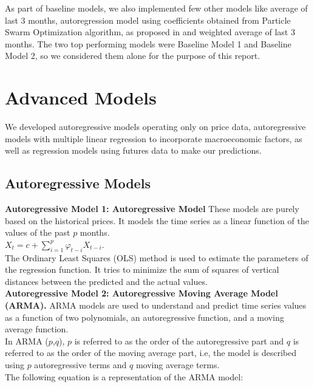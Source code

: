 \documentclass[runningheads]{llncs}
\begin{document}
As part of baseline models, we also implemented few other models like average of last 3 months, autoregression model using coefficients obtained from Particle Swarm Optimization algorithm, as proposed in \cite{gold-pso} and weighted average of last 3 months. The two top performing models were Baseline Model 1 and Baseline Model 2, so we considered them alone for the purpose of this report.

\section{Advanced Models}

We developed autoregressive models operating only on price data, autoregressive models with multiple linear regression to incorporate macroeconomic factors, as well as regression models using futures data to make our predictions. \\

\subsection{Autoregressive Models}
\noindent\textbf{Autoregressive Model 1: Autoregressive Model} These models are purely based on the historical prices. It models the time series as a linear function of the values of the past $p$ months.\\

$ X_{t} = c + \sum\limits_{i=1}^p \varphi_{t-i}X_{t-i}$. \\

\noindent The Ordinary Least Squares (OLS) method is used to estimate the parameters of the regression function. It tries to minimize the sum of squares of vertical distances between the predicted and the actual values. \\

\noindent\textbf{Autoregressive Model 2: Autoregressive Moving Average Model (ARMA).} ARMA models are used to understand and predict time series values as a function of two polynomials, an autoregressive function, and a moving average function. 
\\

\noindent In ARMA ($p$,$q$), $p$ is referred to as the order of the autoregressive part and $q$ is referred to as the order of the moving average part, i.e, the model is described using $p$ autoregressive terms and $q$ moving average terms. \\
The following equation is a representation of the ARMA model:\\ 
\end{document}
